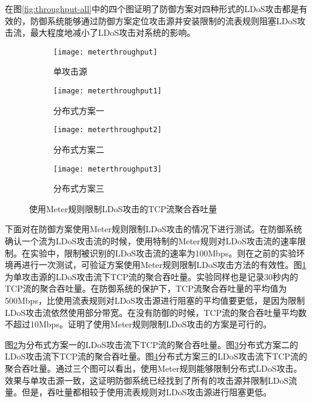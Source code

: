 在图\ref{fig:throughput-all}中的四个图证明了防御方案对四种形式的LDoS攻击都是有效的，防御系统能够通过防御方案定位攻击源并安装限制的流表规则阻塞LDoS攻击流，最大程度地减小了LDoS攻击对系统的影响。


\begin{figure}
    \begin{subfigure}{.49\textwidth}
        \centering
        \texttt{[image: meterthroughput]}
        \caption{单攻击源}
        \label{fig:meter-throughput-single}
    \end{subfigure}
    \begin{subfigure}{.49\textwidth}
        \centering
        \texttt{[image: meterthroughput1]}
        \caption{分布式方案一}
        \label{fig:meter-throughput-2h-mod1}
    \end{subfigure}

    \begin{subfigure}{.49\textwidth}
        \centering
        \texttt{[image: meterthroughput2]}
        \caption{分布式方案二}
        \label{fig:meter-throughput-2h-mod2}
    \end{subfigure}
    \begin{subfigure}{.49\textwidth}
        \centering
        \texttt{[image: meterthroughput3]}
        \caption{分布式方案三}
        \label{fig:meter-throughput-2h-mod3}
    \end{subfigure}


    \caption{使用Meter规则限制LDoS攻击的TCP流聚合吞吐量}
    \label{fig:meter-throughput-all}
\end{figure}


下面对在防御方案使用Meter规则限制LDoS攻击的情况下进行测试。在防御系统确认一个流为LDoS攻击流的时候，使用特制的Meter规则对LDoS攻击流的速率限制。在实验中，限制被识别的LDoS攻击流的速率为100Mbps。则在之前的实验环境再进行一次测试，可验证方案使用Meter规则限制LDoS攻击方法的有效性。图\ref{fig:meter-throughput-single}为单攻击源的LDoS攻击流下TCP流的聚合吞吐量。实验同样也是记录30秒内的TCP流的聚合吞吐量。在防御系统的保护下，TCP流聚合吞吐量的平均值为500Mbps，比使用流表规则对LDoS攻击源进行阻塞的平均值要更低，是因为限制LDoS攻击流依然使用部分带宽。在没有防御的时候，TCP流的聚合吞吐量平均数不超过10Mbps。证明了使用Meter规则限制LDoS攻击的方案是可行的。

图\ref{fig:meter-throughput-2h-mod1}为分布式方案一的LDoS攻击流下TCP流的聚合吞吐量。图\ref{fig:meter-throughput-2h-mod2}分布式方案二的LDoS攻击流下TCP流的聚合吞吐量。图\ref{fig:meter-throughput-2h-mod3}分布式方案三的LDoS攻击流下TCP流的聚合吞吐量。通过三个图可以看出，使用Meter规则能够限制分布式LDoS攻击。效果与单攻击源一致，这证明防御系统已经找到了所有的攻击源并限制LDoS流量。但是，吞吐量都相较于使用流表规则对LDoS攻击源进行阻塞更低。

